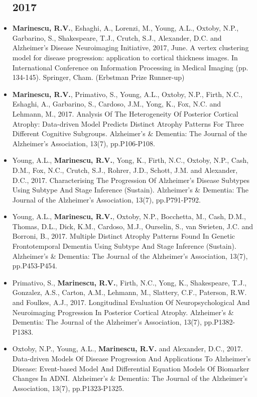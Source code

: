 \documentclass[a4paper,10pt]{article} %
\begin{document}
\begin{itemize}
\subsection*{2017}
\item[\talk] \textbf{Marinescu, R.V.}, Eshaghi, A., Lorenzi, M., Young, A.L., Oxtoby, N.P., Garbarino, S., Shakespeare, T.J., Crutch, S.J., Alexander, D.C. and Alzheimer’s Disease Neuroimaging Initiative, 2017, June. A vertex clustering model for disease progression: application to cortical thickness images. In International Conference on Information Processing in Medical Imaging (pp. 134-145). Springer, Cham. (Erbstman Prize Runner-up)
\item[\poster] \textbf{Marinescu, R.V.}, Primativo, S., Young, A.L., Oxtoby, N.P., Firth, N.C., Eshaghi, A., Garbarino, S., Cardoso, J.M., Yong, K., Fox, N.C. and Lehmann, M., 2017. Analysis Of The Heterogeneity Of Posterior Cortical Atrophy: Data-driven Model Predicts Distinct Atrophy Patterns For Three Different Cognitive Subgroups. Alzheimer's \& Dementia: The Journal of the Alzheimer's Association, 13(7), pp.P106-P108.
\item[\poster] Young, A.L., \textbf{Marinescu, R.V.}, Yong, K., Firth, N.C., Oxtoby, N.P., Cash, D.M., Fox, N.C., Crutch, S.J., Rohrer, J.D., Schott, J.M. and Alexander, D.C., 2017. Characterising The Progression Of Alzheimer’s Disease Subtypes Using Subtype And Stage Inference (Sustain). Alzheimer's \& Dementia: The Journal of the Alzheimer's Association, 13(7), pp.P791-P792.
\item[\poster] Young, A.L., \textbf{Marinescu, R.V.}, Oxtoby, N.P., Bocchetta, M., Cash, D.M., Thomas, D.L., Dick, K.M., Cardoso, M.J., Ourselin, S., van Swieten, J.C. and Borroni, B., 2017. Multiple Distinct Atrophy Patterns Found In Genetic Frontotemporal Dementia Using Subtype And Stage Inference (Sustain). Alzheimer's \& Dementia: The Journal of the Alzheimer's Association, 13(7), pp.P453-P454.
\item[\poster] Primativo, S., \textbf{Marinescu, R.V.}, Firth, N.C., Yong, K., Shakespeare, T.J., Gonzalez, A.S., Carton, A.M., Lehmann, M., Slattery, C.F., Paterson, R.W. and Foulkes, A.J., 2017. Longitudinal Evaluation Of Neuropsychological And Neuroimaging Progression In Posterior Cortical Atrophy. Alzheimer's \& Dementia: The Journal of the Alzheimer's Association, 13(7), pp.P1382-P1383.
\item[\poster] Oxtoby, N.P., Young, A.L., \textbf{Marinescu, R.V.} and Alexander, D.C., 2017. Data-driven Models Of Disease Progression And Applications To Alzheimer’s Disease: Event-based Model And Differential Equation Models Of Biomarker Changes In ADNI. Alzheimer's \& Dementia: The Journal of the Alzheimer's Association, 13(7), pp.P1323-P1325.


\end{itemize}
\end{document}
